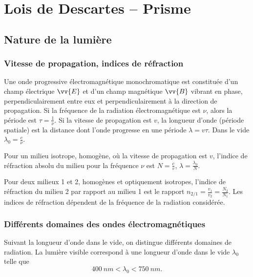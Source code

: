 \chapter{Lois de Descartes -- Prisme}
\label{chap:loisdedescartes}
\minitoc
\minilof
\minilot

\section{Nature de la lumière}
\label{chap6-sec:naturedelalumiere}

\subsection{Vitesse de propagation, indices de réfraction}
\label{chap6-subsec:vitessedepropagation}

Une onde progressive électromagnétique monochromatique est constituée d'un champ électrique $\vv{E}$ et d'un champ magnétique $\vv{B}$ vibrant en phase, perpendiculairement entre eux et perpendiculairement à la direction de propagation. 
Si la fréquence de la radiation électromagnétique est $\nu$, alors la période est $\tau = \frac{1}{\nu}$. Si la vitesse de propagation est $v$, la longueur d'onde (période spatiale) est la distance dont l'onde progresse en une période $\lambda = v \tau$. Dans le vide $\lambda_0 = \frac{c}{\nu}$.

Pour un milieu isotrope, homogène, où la vitesse de propagation est $v$, l'indice de réfraction absolu du milieu pour la fréquence $\nu$ est $N = \frac{c}{v}$, $\lambda =  \frac{\lambda_0}{N}$.

Pour deux milieux 1 et 2, homogènes et optiquement isotropes, l'indice de réfraction du milieu 2 par rapport au milieu 1 est le rapport $n_{2/1}= \frac{v_1}{v_2}=\frac{N_2}{N_1}$. Les indices de réfraction dépendent de la fréquence de la radiation considérée.

\subsection{Différents domaines des ondes électromagnétiques}
\label{chap6-subsec:domainesdesondes}

Suivant la longueur d'onde dans le vide, on distingue différents domaines de radiation. La lumière visible correspond à une longueur d'onde dans le vide $\lambda_0$ telle que
\begin{equation}
  \SI{400}{nm} < \lambda_0 < \SI{750}{nm}.
\end{equation}

